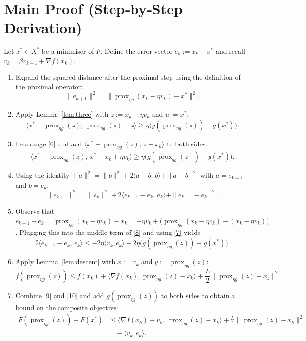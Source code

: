 \documentclass{article}
\newcommand{\prox}{\operatorname{prox}}
\begin{document}
\section*{Main Proof (Step‑by‑Step Derivation)}
Let $x^{*}\in X^{*}$ be a minimiser of $F$.  
Define the error vector $e_{k}:=x_{k}-x^{*}$ and recall $v_{k}= \beta v_{k-1}+ \nabla f(x_{k})$.

\begin{enumerate}[label=[Step \arabic*], leftmargin=*]
\item Expand the squared distance after the proximal step using the definition of the proximal operator:
\[
\|e_{k+1}\|^{2}
= \bigl\| \prox_{\eta g}(x_{k}-\eta v_{k})-x^{*}\bigr\|^{2}.
\tag{5}
\]

\item Apply Lemma~\ref{lem:three} with $z:=x_{k}-\eta v_{k}$ and $u:=x^{*}$:
\[
\bigl\langle x^{*}-\prox_{\eta g}(z),\,\prox_{\eta g}(z)-z\bigr\rangle
\ge \eta\bigl(g(\prox_{\eta g}(z))-g(x^{*})\bigr).
\tag{6}
\]

\item Rearrange \eqref{6} and add $\langle x^{*}-\prox_{\eta g}(z),\,z-x_{k}\rangle$ to both sides:
\[
\langle x^{*}-\prox_{\eta g}(z),\,x^{*}-x_{k}+\eta v_{k}\rangle
\ge \eta\bigl(g(\prox_{\eta g}(z))-g(x^{*})\bigr).
\tag{7}
\]

\item Using the identity $\|a\|^{2}= \|b\|^{2}+2\langle a-b,\,b\rangle+\|a-b\|^{2}$ with $a=e_{k+1}$ and $b=e_{k}$,
\[
\|e_{k+1}\|^{2}= \|e_{k}\|^{2}+2\langle e_{k+1}-e_{k},\,e_{k}\rangle+\|e_{k+1}-e_{k}\|^{2}.
\tag{8}
\]

\item Observe that $e_{k+1}-e_{k}= \prox_{\eta g}(x_{k}-\eta v_{k})-x_{k}= -\eta v_{k}+ \bigl(\prox_{\eta g}(x_{k}-\eta v_{k})-(x_{k}-\eta v_{k})\bigr)$.
Plugging this into the middle term of \eqref{8} and using \eqref{7} yields
\[
2\langle e_{k+1}-e_{k},\,e_{k}\rangle
\le -2\eta\langle v_{k},e_{k}\rangle
-2\eta\bigl(g(\prox_{\eta g}(z))-g(x^{*})\bigr).
\tag{9}
\]

\item Apply Lemma~\ref{lem:descent} with $x:=x_{k}$ and $y:=\prox_{\eta g}(z)$:
\[
f(\prox_{\eta g}(z))\le f(x_{k})+\langle\nabla f(x_{k}),\prox_{\eta g}(z)-x_{k}\rangle+\frac{L}{2}\|\prox_{\eta g}(z)-x_{k}\|^{2}.
\tag{10}
\]

\item Combine \eqref{9} and \eqref{10} and add $g(\prox_{\eta g}(z))$ to both sides to obtain a bound on the composite objective:
\[
\begin{aligned}
F(\prox_{\eta g}(z)) - F(x^{*})
&\le \langle \nabla f(x_{k})-v_{k},\,\prox_{\eta g}(z)-x_{k}\rangle
      +\frac{L}{2}\|\prox_{\eta g}(z)-x_{k}\|^{2}\\
&\quad -\langle v_{k},e_{k}\rangle .
\end{aligned}
\tag{11}
\]


\end{enumerate}
\end{document}
